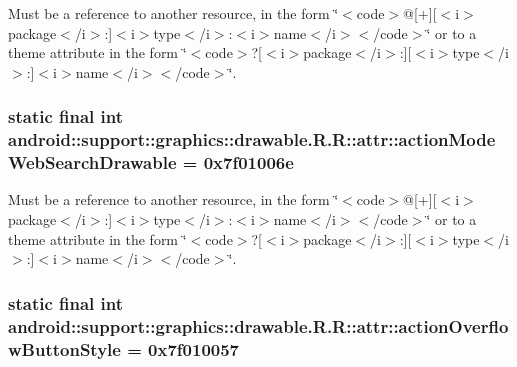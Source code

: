 Must be a reference to another resource, in the form \char`\"{}$<$code$>$@\mbox{[}+\mbox{]}\mbox{[}$<$i$>$package$<$/i$>$:\mbox{]}$<$i$>$type$<$/i$>$:$<$i$>$name$<$/i$>$$<$/code$>$\char`\"{} or to a theme attribute in the form \char`\"{}$<$code$>$?\mbox{[}$<$i$>$package$<$/i$>$:\mbox{]}\mbox{[}$<$i$>$type$<$/i$>$:\mbox{]}$<$i$>$name$<$/i$>$$<$/code$>$\char`\"{}. \hypertarget{classandroid_1_1support_1_1graphics_1_1drawable_1_1_r_1_1attr_299adda7c189c3b8410840d9c7be6fb9}{
\subsubsection[{actionModeWebSearchDrawable}]{\setlength{\rightskip}{0pt plus 5cm}static final int android::support::graphics::drawable.R.R::attr::actionModeWebSearchDrawable = 0x7f01006e}}
\label{classandroid_1_1support_1_1graphics_1_1drawable_1_1_r_1_1attr_299adda7c189c3b8410840d9c7be6fb9}


Must be a reference to another resource, in the form \char`\"{}$<$code$>$@\mbox{[}+\mbox{]}\mbox{[}$<$i$>$package$<$/i$>$:\mbox{]}$<$i$>$type$<$/i$>$:$<$i$>$name$<$/i$>$$<$/code$>$\char`\"{} or to a theme attribute in the form \char`\"{}$<$code$>$?\mbox{[}$<$i$>$package$<$/i$>$:\mbox{]}\mbox{[}$<$i$>$type$<$/i$>$:\mbox{]}$<$i$>$name$<$/i$>$$<$/code$>$\char`\"{}. \hypertarget{classandroid_1_1support_1_1graphics_1_1drawable_1_1_r_1_1attr_71f74c698f789316e83965cfd74023fb}{
\subsubsection[{actionOverflowButtonStyle}]{\setlength{\rightskip}{0pt plus 5cm}static final int android::support::graphics::drawable.R.R::attr::actionOverflowButtonStyle = 0x7f010057}}
\label{classandroid_1_1support_1_1graphics_1_1drawable_1_1_r_1_1attr_71f74c698f789316e83965cfd74023fb}



